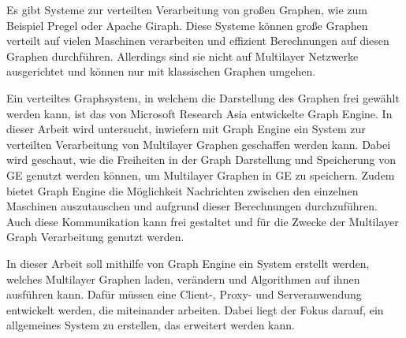 Es gibt Systeme zur verteilten Verarbeitung von großen Graphen, wie zum Beispiel Pregel \cite{pregel} oder Apache Giraph. Diese Systeme können große Graphen verteilt auf vielen Maschinen verarbeiten und effizient Berechnungen auf diesen Graphen durchführen. Allerdings sind sie nicht auf Multilayer Netzwerke ausgerichtet und können nur mit klassischen Graphen umgehen.


Ein verteiltes Graphsystem, in welchem die Darstellung des Graphen frei gewählt werden kann, ist das von Microsoft Research Asia entwickelte Graph Engine.
In dieser Arbeit wird untersucht, inwiefern mit Graph Engine ein System zur verteilten Verarbeitung von Multilayer Graphen geschaffen werden kann. Dabei wird geschaut, wie die Freiheiten in der Graph Darstellung und Speicherung von GE genutzt werden können,
um Multilayer Graphen in GE zu speichern. Zudem bietet Graph Engine die Möglichkeit Nachrichten zwischen den einzelnen Maschinen auszutauschen und aufgrund dieser Berechnungen durchzuführen. Auch diese Kommunikation kann frei gestaltet und für die Zwecke der Multilayer Graph Verarbeitung genutzt werden.


In dieser Arbeit soll mithilfe von Graph Engine ein System erstellt werden, welches Multilayer Graphen laden, verändern und Algorithmen auf ihnen ausführen kann. Dafür müssen eine Client-, Proxy- und Serveranwendung entwickelt werden, die miteinander arbeiten.
Dabei liegt der Fokus darauf, ein allgemeines System zu erstellen, das erweitert werden kann. 
